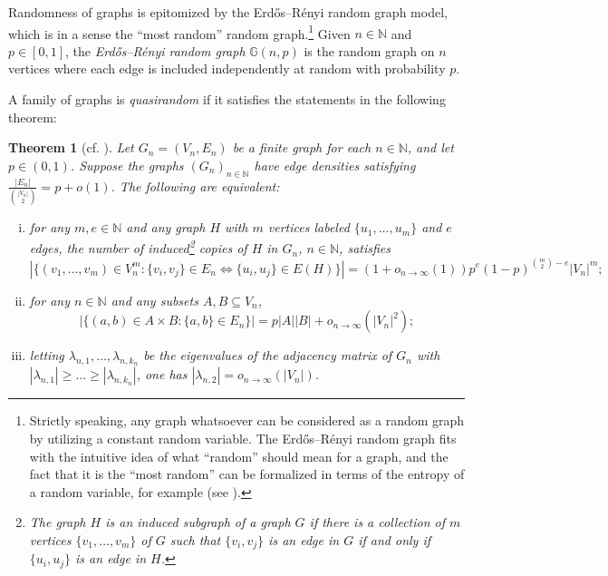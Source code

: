 \documentclass{amsart}
\newtheorem{theorem}{Theorem}[section]
\theoremstyle{definition}
\numberwithin{equation}{section}
\newcommand{\N}{\mathbb{N}}
\begin{document}
Randomness of graphs is epitomized by the Erd\H{o}s--R\'{e}nyi random graph model, which is in a sense the ``most random'' random graph.\footnote{Strictly speaking, any graph whatsoever can be considered as a random graph by utilizing a constant random variable. The Erd\H{o}s--R\'{e}nyi random graph fits with the intuitive idea of what ``random'' should mean for a graph, and the fact that it is the ``most random'' can be formalized in terms of the entropy of a random variable, for example (see \cite[Section III. A.]{pn}).}
Given $n \in \N$ and $p \in [0,1]$, the \emph{Erd\H{o}s--R\'{e}nyi random graph} $\mathbb{G}(n,p)$ is the random graph on $n$ vertices where each edge is included independently at random with probability $p$.

A family of graphs is \emph{quasirandom} if it satisfies the statements in the following theorem:

\begin{theorem}[cf. {\cite{cgw}}] \label{thm: CGW quasirandom}
    Let $G_n = (V_n, E_n)$ be a finite graph for each $n \in \N$, and let $p \in (0,1)$.
    Suppose the graphs $(G_n)_{n \in \N}$ have edge densities satisfying $\frac{|E_n|}{\binom{|V_n|}{2}} = p + o(1)$.
    The following are equivalent:
    \begin{enumerate}[(i)]
        \item for any $m, e \in \N$ and any graph $H$ with $m$ vertices labeled $\{u_1, \dots, u_m\}$ and $e$ edges, the number of induced\footnote{The graph $H$ is an \emph{induced subgraph} of a graph $G$ if there is a collection of $m$ vertices $\{v_1, \dots, v_m\}$ of $G$ such that $\{v_i,v_j\}$ is an edge in $G$ if and only if $\{u_i,u_j\}$ is an edge in $H$.} copies of $H$ in $G_n$, $n \in \N$, satisfies
            \begin{equation*}
                \left| \{(v_1, \dots, v_m) \in V_n^m : \{v_i,v_j\} \in E_n \iff \{u_i,u_j\} \in E(H)\} \right| = (1 + o_{n \to \infty}(1)) p^e (1-p)^{\binom{m}{2}-e}|V_n|^m;
            \end{equation*}
        \item for any $n \in \N$ and any subsets $A, B \subseteq V_n$,
            \begin{equation*}
                \left| \{(a,b) \in A \times B : \{a,b\} \in E_n\} \right| = p|A| |B| + o_{n \to \infty}(|V_n|^2);
            \end{equation*}
        \item letting $\lambda_{n,1}, \dots, \lambda_{n,k_n}$ be the eigenvalues of the adjacency matrix of $G_n$ with $|\lambda_{n,1}| \ge \dots \ge |\lambda_{n,k_n}|$, one has $|\lambda_{n,2}| = o_{n \to \infty}(|V_n|)$.
    \end{enumerate}
\end{theorem}
\end{document}
